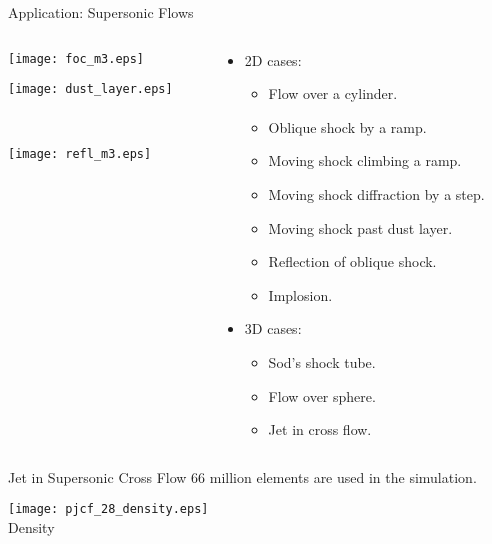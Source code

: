 \documentclass[dvips,xcolor=pst,14pt]{beamer}
\begin{document}
\begin{frame}{
%
Application: Supersonic Flows
%
}
\begin{columns}[c]
\begin{column}{.6\textwidth}
\begin{center}
  \begin{minipage}[c]{\textwidth} \centering
    \parbox{0.3\textwidth}{\texttt{[image: foc\_m3.eps]}}
    \hfill
    \parbox{0.65\textwidth}{%
    \texttt{[image: dust\_layer.eps]}}
  \end{minipage} \\
  \begin{minipage}[c]{\textwidth} \centering
    \parbox{\textwidth}{\texttt{[image: refl\_m3.eps]}}
  \end{minipage}
\end{center}\end{column}
\begin{column}{.4\textwidth}
\begin{itemize} \scriptsize
  \item 2D cases:
  \begin{itemize} \scriptsize
    \item Flow over a cylinder.
    \item Oblique shock by a ramp.
    \item Moving shock climbing a ramp.
    \item Moving shock diffraction by a step.
    \item Moving shock past dust layer.
    \item Reflection of oblique shock.
    \item Implosion.
  \end{itemize}
  \item 3D cases:
  \begin{itemize} \scriptsize
    \item Sod's shock tube.
    \item Flow over sphere.
    \item Jet in cross flow.
  \end{itemize}
\end{itemize}
\end{column}
\end{columns}
\end{frame}

\begin{frame}{
%
Jet in Supersonic Cross Flow
%
}
66 million elements are used in the simulation.
\begin{center}
  \texttt{[image: pjcf\_28\_density.eps]} \\
  \scriptsize Density
\end{center}
\end{frame}
\end{document}
